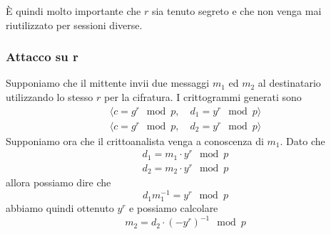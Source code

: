 \`E quindi molto importante che $r$ sia tenuto segreto e che non venga mai riutilizzato per sessioni diverse.

\subsubsection{Attacco su r}
Supponiamo che il mittente invii due messaggi $m_1$ ed $m_2$ al destinatario utilizzando lo stesso $r$ per la
cifratura. I crittogrammi generati sono
\[
	\begin{matrix}
		\langle c = g^r \mod{p}, \quad d_1 = y^r \mod{p} \rangle \\
		\langle c = g^r \mod{p}, \quad d_2 = y^r \mod{p} \rangle
	\end{matrix}
\]
Supponiamo ora che il crittoanalista venga a conoscenza di $m_1$. Dato che
\[
	\begin{matrix}
		d_1 = m_1 \cdot y^r \mod{p} \\
		d_2 = m_2 \cdot y^r \mod{p}
	\end{matrix}
\]
allora possiamo dire che
\[ d_1 m_1^{-1} = y^r \mod{p} \]
abbiamo quindi ottenuto $y^r$ e possiamo calcolare
\[ m_2 = d_2 \cdot (-y^r)^{-1} \mod{p} \]